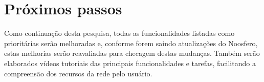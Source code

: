 \section{Próximos passos}
\label{sec:futuro} 

    Como continuação desta pesquisa, todas as funcionalidades listadas como prioritárias serão melhoradas e, conforme forem saindo atualizações do Noosfero, estas melhorias serão reavaliadas para checagem destas mudanças. Também serão elaborados vídeos tutoriais das principais funcionalidades e tarefas, facilitando a compreensão dos recursos da rede pelo usuário.




